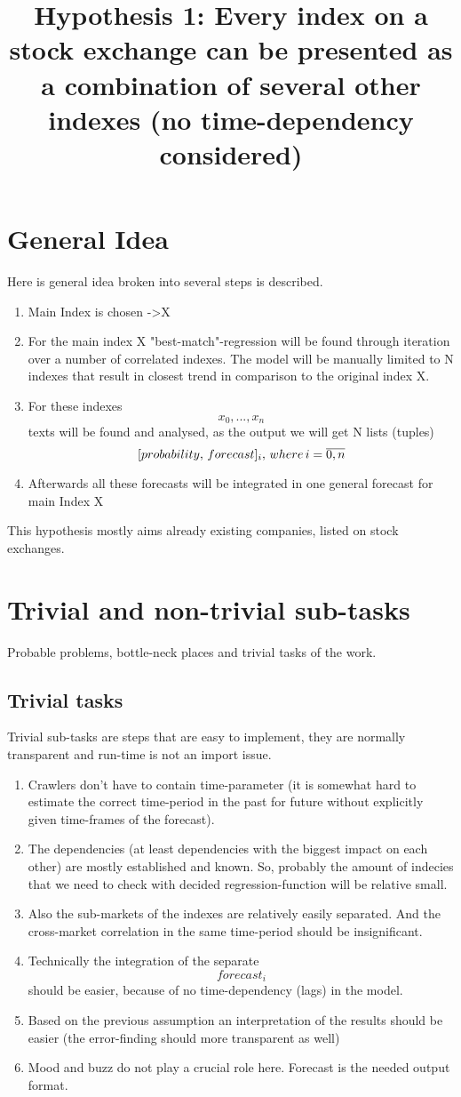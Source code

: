 \documentclass{article}
\title{Hypothesis 1: Every index on a stock exchange can be presented as a combination of several other indexes (no time-dependency considered)}
\begin{document}
\maketitle
\section{General Idea}
Here is general idea broken into several steps is described.

\begin{enumerate}
	\item Main Index is chosen -\textgreater X
	\item For the main index X "best-match"-regression will be found through iteration over a number of correlated indexes. The model will be manually limited to N indexes that result in closest trend in comparison to the original index X.    
	\item For these indexes \[x_{0},...,x_{n}\] texts will be found and analysed, as the output we will get N lists (tuples) \[[probability,\thinspace forecast]_{i}, \thinspace where \thinspace i=\overline{0,n}\] 
	\item Afterwards all these forecasts will be integrated in one general forecast for main Index X
\end{enumerate}
This hypothesis mostly aims already existing companies, listed on stock exchanges.  


\newpage
\section{Trivial and non-trivial sub-tasks}
Probable problems, bottle-neck places and trivial tasks of the work.
\subsection{Trivial tasks}
Trivial sub-tasks are steps that are easy to implement, they are normally transparent and run-time is not an import issue.
\begin{enumerate}
	\item Crawlers don't have to contain time-parameter (it is somewhat hard to estimate the correct time-period in the past for future without explicitly given time-frames of the forecast).
	\item The dependencies (at least dependencies with the biggest impact on each other) are mostly established and known. So, probably the amount of indecies that we need to check with decided regression-function will be relative small.
	\item Also the sub-markets of the indexes are relatively easily separated. And the cross-market correlation in the same time-period should be insignificant.
	\item Technically the integration of the separate \[forecast_{i}\] should be easier, because of no time-dependency (lags) in the model.
	\item Based on the previous assumption an interpretation of the results should be easier (the error-finding should more transparent as well) 
	\item Mood and buzz do not play a crucial role here. Forecast is the needed output format.
\end{enumerate}  
\end{document}
